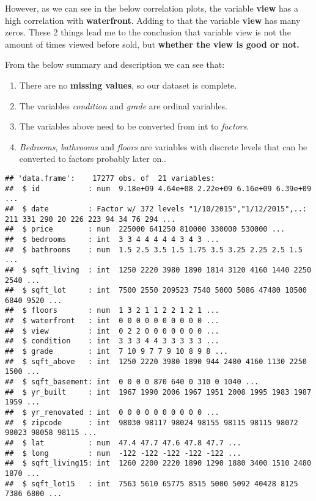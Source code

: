 \documentclass[]{article}
\providecommand{\tightlist}{%
  \setlength{\itemsep}{0pt}\setlength{\parskip}{0pt}}
\begin{document}
However, as we can see in the below correlation plots, the variable
\textbf{view} has a high correlation with \textbf{waterfront}. Adding to
that the variable \textbf{view} has many zeros. These 2 things lead me
to the conclusion that variable view is not the amount of times viewed
before sold, but \textbf{whether the view is good or not.}

From the below summary and description we can see that:

\begin{enumerate}
\def\labelenumi{\arabic{enumi}.}
\tightlist
\item
  There are no \textbf{missing values}, so our dataset is complete.
\item
  The variables \emph{condition} and \emph{grade} are ordinal variables.
\item
  The variables above need to be converted from int to \emph{factors}.
\item
  \emph{Bedrooms}, \emph{bathrooms} and \emph{floors} are variables with
  discrete levels that can be converted to factors probably later on..
\end{enumerate}

\begin{verbatim}
## 'data.frame':    17277 obs. of  21 variables:
##  $ id           : num  9.18e+09 4.64e+08 2.22e+09 6.16e+09 6.39e+09 ...
##  $ date         : Factor w/ 372 levels "1/10/2015","1/12/2015",..: 211 331 290 20 226 223 94 34 76 294 ...
##  $ price        : num  225000 641250 810000 330000 530000 ...
##  $ bedrooms     : int  3 3 4 4 4 4 4 3 4 3 ...
##  $ bathrooms    : num  1.5 2.5 3.5 1.5 1.75 3.5 3.25 2.25 2.5 1.5 ...
##  $ sqft_living  : int  1250 2220 3980 1890 1814 3120 4160 1440 2250 2540 ...
##  $ sqft_lot     : int  7500 2550 209523 7540 5000 5086 47480 10500 6840 9520 ...
##  $ floors       : num  1 3 2 1 1 2 2 1 2 1 ...
##  $ waterfront   : int  0 0 0 0 0 0 0 0 0 0 ...
##  $ view         : int  0 2 2 0 0 0 0 0 0 0 ...
##  $ condition    : int  3 3 3 4 4 3 3 3 3 3 ...
##  $ grade        : int  7 10 9 7 7 9 10 8 9 8 ...
##  $ sqft_above   : int  1250 2220 3980 1890 944 2480 4160 1130 2250 1500 ...
##  $ sqft_basement: int  0 0 0 0 870 640 0 310 0 1040 ...
##  $ yr_built     : int  1967 1990 2006 1967 1951 2008 1995 1983 1987 1959 ...
##  $ yr_renovated : int  0 0 0 0 0 0 0 0 0 0 ...
##  $ zipcode      : int  98030 98117 98024 98155 98115 98115 98072 98023 98058 98115 ...
##  $ lat          : num  47.4 47.7 47.6 47.8 47.7 ...
##  $ long         : num  -122 -122 -122 -122 -122 ...
##  $ sqft_living15: int  1260 2200 2220 1890 1290 1880 3400 1510 2480 1870 ...
##  $ sqft_lot15   : int  7563 5610 65775 8515 5000 5092 40428 8125 7386 6800 ...
\end{verbatim}
\end{document}
